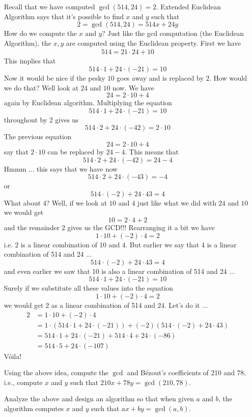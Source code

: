 Recall that we have computed $\gcd(514, 24) = 2$.
Extended Euclidean Algorithm says that it's possible to find $x$ and $y$
such that
\[
2 = \gcd(514, 24) = 514x + 24y
\]
How do we compute the $x$ and $y$?
Just like the gcd computation (the Euclidean Algorithm),
the $x,y$ are computed using the Euclidean property.
First we have
\begin{align*}
514 = 21 \cdot 24 + 10
\end{align*}
This implies that 
\[
514 \cdot 1 + 24 \cdot (-21) = 10
\]
Now it would be nice if the pesky $10$ goes away and is replaced by
$2$.
How would we do that?
Well look at $24$ and $10$ now.
We have
\[
24 = 2 \cdot 10 + 4
\]
again by Euclidean algorithm.
Multiplying the equation
\[
514 \cdot 1 + 24 \cdot (-21) = 10
\]
throughout by 2 gives us
\[
514 \cdot 2 + 24 \cdot (-42) = 2 \cdot 10
\]
The previous equation
\[
24 = 2 \cdot 10 + 4
\]
say that $2 \cdot 10$ can be replaced by $24 - 4$.
This means that
\[
514 \cdot 2 + 24 \cdot (-42) = 24 - 4
\]
Hmmm ... this says that we have now
\[
514 \cdot 2 + 24 \cdot (-43) = -4
\]
or
\[
514 \cdot (-2) + 24 \cdot 43 = 4
\]
What about 4?
Well, if we look at $10$ and $4$ just like what we did with $24$ and $10$
we would get
\[
10 = 2 \cdot 4 + 2
\]
and the remainder $2$ gives us the GCD!!!
Rearranging it a bit we have
\[
1 \cdot 10 + (-2) \cdot 4 = 2
\]
i.e. 2 is a linear combination of 10 and 4.
But earlier we say that 4 is a linear combination of 514 and 24 ...
\[
514 \cdot (-2) + 24 \cdot 43 = 4
\]
and even earlier we saw that 10 is also a linear combination of 514 and 24 ...
\[
514 \cdot 1 + 24 \cdot (-21) = 10
\]
Surely if we substitute all these values into the equation
\[
1 \cdot 10 + (-2) \cdot 4 = 2
\]
we would get 2 as a linear combination of 514 and 24.
Let's do it ...
\begin{align*}
2 
&= 1 \cdot 10 + (-2) \cdot 4 \\
&= 1 \cdot (514 \cdot 1 + 24 \cdot (-21)) + (-2) (514 \cdot (-2) + 24 \cdot 43) \\
&= 514 \cdot 1 + 24 \cdot (-21) + 514 \cdot 4 + 24 \cdot (-86) \\
&= 514 \cdot 5 + 24 \cdot (-107)
\end{align*}
V\'oila!

\newpage
\begin{ex}
  Using the above idea,
  compute the $\gcd$ and B\'ezout's coefficients of 210 and 78, i.e.,
  compute $x$ and $y$ such that $210x + 78y = \gcd(210, 78)$.
\end{ex}

\newpage
\begin{ex}
Analyze the above and design an algorithm 
so that when given $a$ and $b$, the algorithm computes
$x$ and $y$ such that $ax + by = \gcd(a,b)$.
\end{ex}


